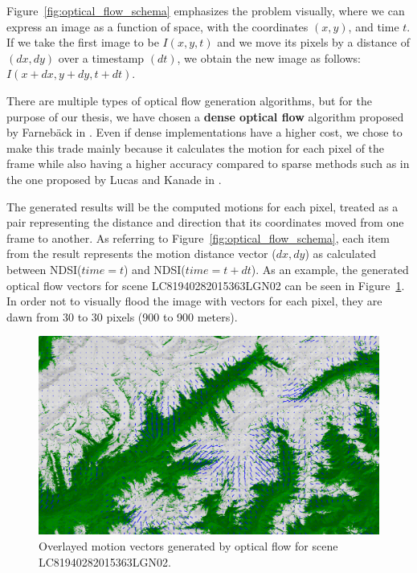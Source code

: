 \documentclass[12pt, a4paper]{report}
\begin{document}
	\par Figure~\ref{fig:optical_flow_schema} emphasizes the problem visually, where we can express an image as a
	function of space, with the coordinates \((x, y)\), and time \(t\). If we take the first image
	to be \(I(x, y, t)\) and we move its pixels by a distance of \((dx, dy)\) over a timestamp \((dt)\), we obtain
	the new image as follows: \(I(x + dx, y + dy, t + dt)\).
	
	\par There are multiple types of optical flow generation algorithms, but for the purpose of our thesis,
	we have chosen a \textbf{dense optical flow} algorithm proposed by Farneb{\"a}ck in \cite{GUNNAR2003}. Even
	if dense implementations have a higher cost, we chose to make this trade mainly because it
	calculates the motion for each pixel of the frame while also having a higher accuracy compared to sparse methods such as in the one proposed by Lucas and Kanade in \cite{KANADE1981}.
	
	\par The generated results will be the computed motions for each pixel, treated as a pair representing the distance and direction that its coordinates moved from one frame to another. As referring to Figure~\ref{fig:optical_flow_schema}, each item from the result represents the motion distance vector (\(dx, dy\)) as calculated between NDSI(\(time=t\)) and NDSI(\(time=t+dt\)). As an example, the generated optical flow vectors for scene LC81940282015363LGN02 can be seen in Figure~\ref{fig:optical_flow_example}. In order not to visually flood the image with vectors for each pixel, they are dawn from 30 to 30 pixels (900 to 900 meters).
	
	\begin{figure}[h]
		\centering
		\includegraphics[width=\columnwidth]{../images/LC81940282015363LGN02_NDSI_vectros_small.png}
		\caption{Overlayed motion vectors generated by optical flow for scene LC81940282015363LGN02.}
		\label{fig:optical_flow_example}
	\end{figure}
\end{document}
